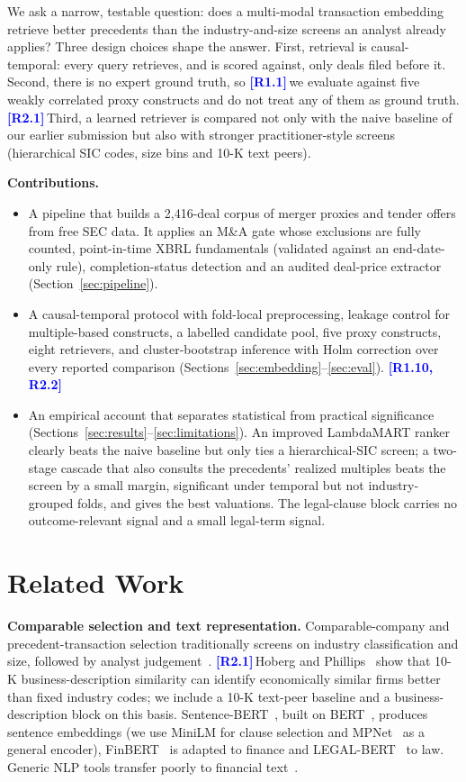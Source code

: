 \documentclass[conference]{IEEEtran}
\newcommand{\rc}[1]{\textcolor{blue}{\textbf{[#1]}}\,}
\newcommand{\rc}[1]{}
\begin{document}
We ask a narrow, testable question: does a multi-modal transaction embedding retrieve better precedents than the industry-and-size screens an analyst already applies? Three design choices shape the answer. First, retrieval is causal-temporal: every query retrieves, and is scored against, only deals filed before it. Second, there is no expert ground truth, so \rc{R1.1}we evaluate against five weakly correlated proxy constructs and do not treat any of them as ground truth. \rc{R2.1}Third, a learned retriever is compared not only with the naive baseline of our earlier submission but also with stronger practitioner-style screens (hierarchical SIC codes, size bins and 10-K text peers).

\noindent\textbf{Contributions.}
\begin{itemize}
\item A pipeline that builds a 2{,}416-deal corpus of merger proxies and tender offers from free SEC data. It applies an M\&A gate whose exclusions are fully counted, point-in-time XBRL fundamentals (validated against an end-date-only rule), completion-status detection and an audited deal-price extractor (Section~\ref{sec:pipeline}).
\item A causal-temporal protocol with fold-local preprocessing, leakage control for multiple-based constructs, a labelled candidate pool, five proxy constructs, eight retrievers, and cluster-bootstrap inference with Holm correction over every reported comparison (Sections~\ref{sec:embedding}--\ref{sec:eval}).
\rc{R1.10, R2.2}\item An empirical account that separates statistical from practical significance (Sections~\ref{sec:results}--\ref{sec:limitations}). An improved LambdaMART ranker clearly beats the naive baseline but only ties a hierarchical-SIC screen; a two-stage cascade that also consults the precedents' realized multiples beats the screen by a small margin, significant under temporal but not industry-grouped folds, and gives the best valuations. The legal-clause block carries no outcome-relevant signal and a small legal-term signal.
\end{itemize}

\section{Related Work}
\label{sec:related}

\noindent\textbf{Comparable selection and text representation.}
Comparable-company and precedent-transaction selection traditionally screens on industry classification and size, followed by analyst judgement~\cite{damodaran2012}. \rc{R2.1}Hoberg and Phillips~\cite{hoberg2016} show that 10-K business-description similarity can identify economically similar firms better than fixed industry codes; we include a 10-K text-peer baseline and a business-description block on this basis. Sentence-BERT~\cite{reimers2019}, built on BERT~\cite{devlin2019}, produces sentence embeddings (we use MiniLM for clause selection and MPNet~\cite{song2020} as a general encoder), FinBERT~\cite{huang2023} is adapted to finance and LEGAL-BERT~\cite{chalkidis2020} to law. Generic NLP tools transfer poorly to financial text~\cite{loughran2011}.
\end{document}
